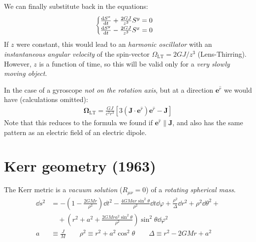 \documentclass[../template.tex]{subfiles}
\begin{document}
We can finally substitute back in the equations:
\begin{align*}
    \begin{cases}
        \dv{S^x}{t} + \frac{2GJ}{z^3} S^y = 0\\
        \dv{S^y}{t} - \frac{2GJ}{z^3} S^x = 0  
    \end{cases}
\end{align*}
If $z$ were constant, this would lead to an \textit{harmonic oscillator} with an \textit{instantaneous angular velocity} of the spin-vector $\Omega_{\mathrm{LT}} = 2 GJ/z^3$ (Lens-Thirring). However, $z$ is a function of time, so this will be valid only for a \textit{very slowly moving object}.

In the case of a gyroscope \textit{not on the rotation axis}, but at a direction $\bm{e}^{\hat{r}}$ we would have (calculations omitted):
\begin{align*}
    \bm{\Omega}_{\mathrm{LT}} = \frac{GJ}{c^2 r^3}\left[3 (\bm{J} \cdot \bm{e}^{\hat{r}}) \bm{e}^{\hat{r}} - \bm{J}\right] 
\end{align*}  
Note that this reduces to the formula we found if $\bm{e}^{\hat{r}} \parallel \bm{J}$, and also has the same pattern as an electric field of an electric dipole. 

\section{Kerr geometry (1963)}
The Kerr metric is a \textit{vacuum solution} ($R_{\mu \nu } = 0$) of a \textit{rotating spherical mass}.
\begin{align*}
    \dd{s^2} &= -\left(1-\frac{2GMr}{\rho^2} \right)\dd{t^2} - \frac{4GM a r\sin^2 \theta}{\rho^2} \dd{t} \dd{\varphi} + \frac{\rho^2}{\Delta} \dd{r^2} + \rho^2 \dd{\theta^2} +\\
    &\quad+ \left(r^2 + a^2 + \frac{2GMr a^2 \sin^2 \theta}{\rho^2} \right)\sin^2 \theta \dd{\varphi^2} \\
    a &\equiv \frac{J}{M} \qquad \rho^2 \equiv r^2 + a^2 \cos^2 \theta \qquad \Delta \equiv r^2 - 2GMr + a^2 
\end{align*}  
\end{document}
